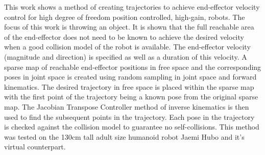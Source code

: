 This work shows a method of creating trajectories to achieve end-effector velocity control for high degree of freedom position controlled, high-gain, robots.  The focus of this work is throwing an object.  It is shown that the full reachable area of the end-effector does not need to be known to achieve the desired velocity when a good collision model of the robot is available.  The end-effector velocity (magnitude and direction) is specified as well as a duration of this velocity.  A sparse map of reachable end-effector positions in free space and the corresponding poses in joint space is created using random sampling in joint space and forward kinematics.  The desired trajectory in free space is placed within the sparse map with the first point of the trajectory being a known pose from the original sparse map.  The Jacobian Transpose Controller method of inverse kinematics is then used to find the subsequent points in the trajectory.  Each pose in the trajectory is checked against the collision model to guarantee no self-collisions.  This method was tested on the 130cm tall adult size humanoid robot Jaemi Hubo and it's virtual counterpart.